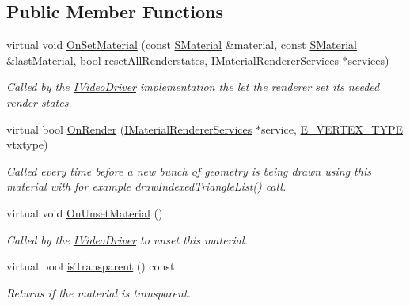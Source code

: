 \subsection*{Public Member Functions}
\begin{DoxyCompactItemize}
\item 
virtual void \hyperlink{classirr_1_1video_1_1IMaterialRenderer_aeaffc03c1b9feb40cd01469726b287e3}{On\+Set\+Material} (const \hyperlink{classirr_1_1video_1_1SMaterial}{S\+Material} \&material, const \hyperlink{classirr_1_1video_1_1SMaterial}{S\+Material} \&last\+Material, bool reset\+All\+Renderstates, \hyperlink{classirr_1_1video_1_1IMaterialRendererServices}{I\+Material\+Renderer\+Services} $\ast$services)
\begin{DoxyCompactList}\small\item\em Called by the \hyperlink{classirr_1_1video_1_1IVideoDriver}{I\+Video\+Driver} implementation the let the renderer set its needed render states. \end{DoxyCompactList}\item 
virtual bool \hyperlink{classirr_1_1video_1_1IMaterialRenderer_a8cb6c5f93856de7586a318f14ed21a22}{On\+Render} (\hyperlink{classirr_1_1video_1_1IMaterialRendererServices}{I\+Material\+Renderer\+Services} $\ast$service, \hyperlink{namespaceirr_1_1video_a0e3b59e025e0d0db0ed2ee0ce904deac}{E\+\_\+\+V\+E\+R\+T\+E\+X\+\_\+\+T\+Y\+PE} vtxtype)
\begin{DoxyCompactList}\small\item\em Called every time before a new bunch of geometry is being drawn using this material with for example draw\+Indexed\+Triangle\+List() call. \end{DoxyCompactList}\item 
virtual void \hyperlink{classirr_1_1video_1_1IMaterialRenderer_a694b1285671853cb151c03100fd01c73}{On\+Unset\+Material} ()
\begin{DoxyCompactList}\small\item\em Called by the \hyperlink{classirr_1_1video_1_1IVideoDriver}{I\+Video\+Driver} to unset this material. \end{DoxyCompactList}\item 
virtual bool \hyperlink{classirr_1_1video_1_1IMaterialRenderer_ac472a5832eed8d848240c82278e56312}{is\+Transparent} () const
\begin{DoxyCompactList}\small\item\em Returns if the material is transparent. \end{DoxyCompactList}\item 

\end{DoxyCompactItemize}
